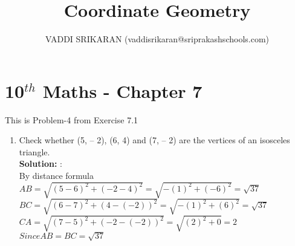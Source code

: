 \documentclass[12pt]{article}
\title{Coordinate Geometry}
\author{VADDI SRIKARAN (vaddisrikaran@sriprakashschools.com)}
\newcommand{\solution}{\noindent \textbf{Solution: }}
\begin{document}
\maketitle
\section*{10$^{th}$ Maths - Chapter 7}
This is Problem-4 from Exercise 7.1
\begin{enumerate}
\item Check whether (5, – 2), (6, 4) and (7, – 2) are the vertices of an isosceles triangle. \\
\solution:\\
By distance formula\\

$AB=\sqrt{(5-6)^2 + (-2-4)^2}= \sqrt{-(1)^2 +(-6)^2}= \sqrt{37}$\\
$BC=\sqrt{(6-7)^2 + (4-(-2))^2}= \sqrt{-(1)^2 +(6)^2}= \sqrt{37}$\\
$CA=\sqrt{(7-5)^2 + (-2-(-2))^2}= \sqrt{(2)^2 +0}= 2$\\

$Since AB=BC=\sqrt{37}$\\





\end{enumerate}
\end{document}
